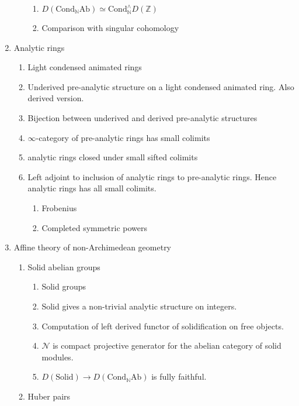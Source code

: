 \documentclass{article}
\begin{document}
\begin{enumerate}
\begin{enumerate}
\begin{enumerate}
          \item $D(\mathrm{Cond}_{\mathbb{N}} \mathrm{Ab}) \simeq 
        \mathrm{Cond}^\wedge_{\mathbb{N}} D(\mathbb{Z})$
          \item Comparison with singular cohomology
        \end{enumerate}
    \end{enumerate}
    \item Analytic rings
    \begin{enumerate}
        \item Light condensed animated rings
        \item Underived pre-analytic structure on a light condensed animated ring.
        Also derived version.
        \item Bijection between underived and derived pre-analytic structures
        \item $\infty$-category of pre-analytic rings has small colimits
        \item analytic rings closed under small sifted colimits
        \item Left adjoint to inclusion of
        analytic rings to pre-analytic rings. 
        Hence analytic rings has all small colimits.
        \begin{enumerate}
            \item Frobenius
            \item Completed symmetric powers
        \end{enumerate}
    \end{enumerate}
    \item Affine theory of non-Archimedean geometry
    \begin{enumerate}
        \item Solid abelian groups
        \begin{enumerate}
            \item Solid groups
            \item Solid gives a non-trivial analytic structure on integers.
            \item Computation of left derived functor of solidification on free objects.
            \item $\mathcal{N}$ is compact projective generator
            for the abelian category of solid modules.
            \item $D(\mathrm{Solid}) \to D(\mathrm{Cond}_{\mathbb{N}} \mathrm{Ab})$
            is fully faithful.
        \end{enumerate}
        \item Huber pairs

\end{enumerate}
\end{enumerate}
\end{document}
